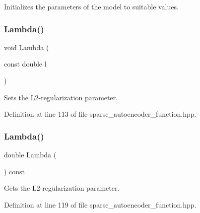 Initializes the parameters of the model to suitable values. 

\mbox{\label{classmlpack_1_1nn_1_1SparseAutoencoderFunction_af476ed1916ad9b39eaddd7e7ac108f4b}} 
\subsubsection{Lambda()\hspace{0.1cm}{\footnotesize\ttfamily [1/2]}}
{\footnotesize\ttfamily void Lambda (\begin{DoxyParamCaption}\item[{const double}]{l }\end{DoxyParamCaption})\hspace{0.3cm}{\ttfamily [inline]}}



Sets the L2-\/regularization parameter. 



Definition at line 113 of file sparse\+\_\+autoencoder\+\_\+function.\+hpp.

\mbox{\label{classmlpack_1_1nn_1_1SparseAutoencoderFunction_a53535041275cedd0ec3de67ca032aa94}} 
\subsubsection{Lambda()\hspace{0.1cm}{\footnotesize\ttfamily [2/2]}}
{\footnotesize\ttfamily double Lambda (\begin{DoxyParamCaption}{ }\end{DoxyParamCaption}) const\hspace{0.3cm}{\ttfamily [inline]}}



Gets the L2-\/regularization parameter. 



Definition at line 119 of file sparse\+\_\+autoencoder\+\_\+function.\+hpp.

\mbox{\label{classmlpack_1_1nn_1_1SparseAutoencoderFunction_a97ac05cf618f1f137a4aa8fcd4e48539}} 
